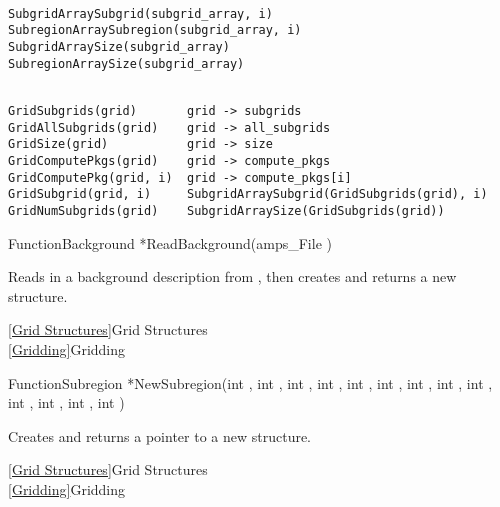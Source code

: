 {\newpage\clearpage
{}%
\begin{display}\begin{verbatim}

SubgridArraySubgrid(subgrid_array, i)  SubregionArraySubregion(subgrid_array, i)
SubgridArraySize(subgrid_array)        SubregionArraySize(subgrid_array)\end{verbatim}
\end{display}%
\lthtmlfigureZ
\lthtmlcheckvsize\clearpage}

{\newpage\clearpage
{}%
\begin{display}\begin{verbatim}

GridSubgrids(grid)       grid -> subgrids
GridAllSubgrids(grid)    grid -> all_subgrids
GridSize(grid)           grid -> size
GridComputePkgs(grid)    grid -> compute_pkgs
GridComputePkg(grid, i)  grid -> compute_pkgs[i]
GridSubgrid(grid, i)     SubgridArraySubgrid(GridSubgrids(grid), i)
GridNumSubgrids(grid)    SubgridArraySize(GridSubgrids(grid))\end{verbatim}
\end{display}%
\lthtmlfigureZ
\lthtmlcheckvsize\clearpage}

{\newpage\clearpage
{}%
\begin{deftypefn}{Function}{Background *}{ReadBackground}(amps_File )
\par
\DESCRIPTION
Reads in a background description from , then
creates and returns a new  structure.
\par
\SEEALSO
\vref{Grid Structures}{Grid Structures}\\
\vref{Gridding}{Gridding}
\par
\end{deftypefn}%
\lthtmlfigureZ
\lthtmlcheckvsize\clearpage}

{\newpage\clearpage
{}%
\begin{deftypefn}{Function}{Subregion *}{NewSubregion}(int , int , int , int , int , int , int , int , int , int , int , int , int )
\par
\DESCRIPTION
Creates and returns a pointer to a new  structure.
\par
\SEEALSO
\vref{Grid Structures}{Grid Structures}\\
\vref{Gridding}{Gridding}
\par
\end{deftypefn}%
\lthtmlfigureZ
\lthtmlcheckvsize\clearpage}

